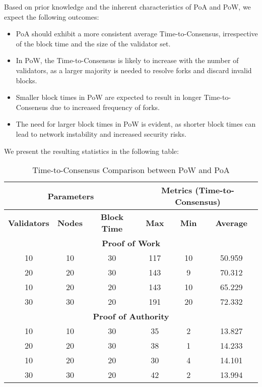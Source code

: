 Based on prior knowledge and the inherent characteristics of PoA and PoW, we expect the following outcomes:

\begin{itemize}
    \item PoA should exhibit a more consistent average Time-to-Consensus, irrespective of the block time and the size of the validator set.
    \item In PoW, the Time-to-Consensus is likely to increase with the number of validators, as a larger majority is needed to resolve forks and discard invalid blocks.
    \item Smaller block times in PoW are expected to result in longer Time-to-Consensus due to increased frequency of forks.
    \item The need for larger block times in PoW is evident, as shorter block times can lead to network instability and increased security risks.
\end{itemize}


We present the resulting statistics in the following table:


\begin{table}[h]
\centering
\caption{Time-to-Consensus Comparison between PoW and PoA}
\label{table:time-to-consensus}
\begin{tabular}{|c|c|c||c|c|c|}
\hline
\multicolumn{3}{|c||}{\textbf{Parameters}} & \multicolumn{3}{c|}{\textbf{Metrics (Time-to-Consensus)}} \\
\hline
\textbf{Validators} & \textbf{Nodes} & \textbf{Block Time} & \textbf{Max} & \textbf{Min} & \textbf{Average} \\
\hline
\multicolumn{6}{|c|}{\textbf{Proof of Work}} \\
\hline
\rowcolor{Gray}
10 & 10 & 30 & 117 & 10 & 50.959 \\
\rowcolor{LightBlue}
20 & 20 & 30 & 143 & 9 & 70.312 \\
\rowcolor{LightYellow}
10 & 20 & 20 & 143 & 10 & 65.229 \\
\rowcolor{LightRed}
30 & 30 & 20 & 191 & 20 & 72.332 \\
\hline
\multicolumn{6}{|c|}{\textbf{Proof of Authority}} \\
\hline
\rowcolor{Gray}
10 & 10 & 30 & 35 & 2 & 13.827 \\
\rowcolor{LightBlue}
20 & 20 & 30 & 38 & 1 & 14.233 \\
\rowcolor{LightYellow}
10 & 20 & 20 & 30 & 4 & 14.101 \\
\rowcolor{LightRed}
30 & 30 & 20 & 42 & 2 & 13.994 \\
\hline
\end{tabular}
\end{table}



